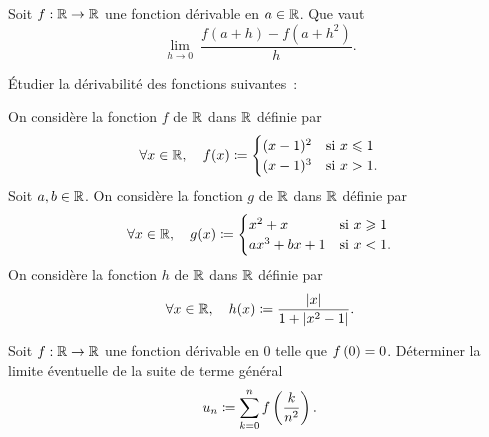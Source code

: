 \documentclass{magnolia}
\begin{document}

Soit $f:\mathbb{R}\to\mathbb{R}$ une fonction dérivable en $a\in\mathbb{R}$. Que vaut
\[\lim_{h\to 0}\ \frac{f(a+h)-f(a+h^2)}{h}.\]


Étudier la dérivabilité des fonctions suivantes~:
\begin{questions}
\question On considère la fonction $f$ de $\mathbb{R}$ dans $\mathbb{R}$ définie par
  \[\forall x\in\mathbb{R},\quad f(x)\coloneqq
    \begin{cases}
(x-1)^2 & \text{si $x\leqslant 1$}\\
(x-1)^3 & \text{si $x> 1$.}
    \end{cases}\]
\question Soit $a,b\in\mathbb{R}$. On considère la fonction $g$ de $\mathbb{R}$ dans $\mathbb{R}$ définie par
\[\forall x\in\mathbb{R},\quad g(x)\coloneqq
\begin{cases}
x^2+x & \text{si $x\geqslant 1$}\\
ax^3+bx+1 & \text{si $x<1$.}
\end{cases}\]
\question On considère la fonction $h$ de $\mathbb{R}$ dans $\mathbb{R}$ définie par
\[\forall x\in\mathbb{R},\quad h(x)\coloneqq\frac{\left|x\right|}{1+\left|x^2-1\right|}.\]
\end{questions}

Soit $f:\mathbb{R}\to\mathbb{R}$ une fonction dérivable en 0 telle que $f\left(0\right)=0$.
Déterminer la limite éventuelle de la suite de terme général
\[u_n\coloneqq \sum_{k=0}^n f\left(\frac{k}{n^2}\right).\]
\end{document}
